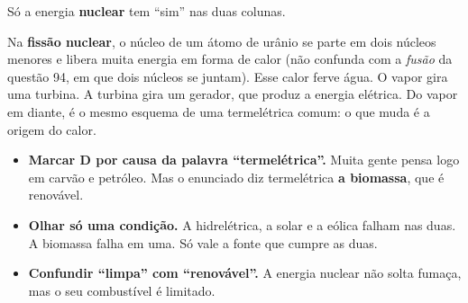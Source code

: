 Só a energia \textbf{nuclear} tem ``sim'' nas duas colunas.


\begin{ideia}
Na \textbf{fissão nuclear}, o núcleo de um átomo de urânio se parte em dois núcleos menores e libera muita energia em forma de calor
(não confunda com a \emph{fusão} da questão 94, em que dois núcleos se juntam).
Esse calor ferve água. O vapor gira uma turbina. A turbina gira um gerador, que produz a energia elétrica.
Do vapor em diante, é o mesmo esquema de uma termelétrica comum: o que muda é a origem do calor.
\end{ideia}

\begin{pegadinha}
\begin{itemize}
  \item \textbf{Marcar D por causa da palavra ``termelétrica''.} Muita gente pensa logo em carvão e petróleo. Mas o enunciado diz
        termelétrica \textbf{a biomassa}, que é renovável.
  \item \textbf{Olhar só uma condição.} A hidrelétrica, a solar e a eólica falham nas duas. A biomassa falha em uma.
        Só vale a fonte que cumpre as duas.
  \item \textbf{Confundir ``limpa'' com ``renovável''.} A energia nuclear não solta fumaça, mas o seu combustível é limitado.
\end{itemize}
\end{pegadinha}
